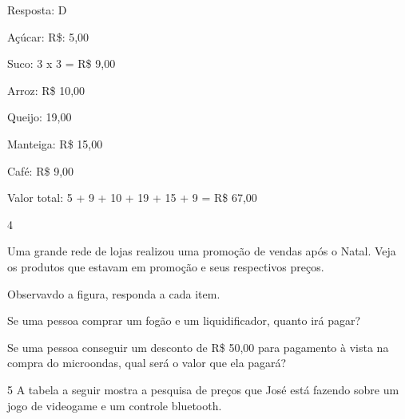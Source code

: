 {Resposta: D

Açúcar: R\$: 5,00

Suco: 3 x 3 = R\$ 9,00

Arroz: R\$ 10,00

Queijo: 19,00

Manteiga: R\$ 15,00

Café: R\$ 9,00

Valor total: 5 + 9 + 10 + 19 + 15 + 9 = R\$ 67,00

\num{4}

Uma grande rede de lojas realizou uma promoção de vendas após o Natal.
Veja os produtos que estavam em promoção e seus respectivos preços.






Observavdo a figura, responda a cada item.

\begin{escolha}

\item
  Se uma pessoa comprar um fogão e um liquidificador, quanto irá pagar?

\item
  Se uma pessoa conseguir um desconto de R\$ 50,00 para pagamento à
  vista na compra do microondas, qual será o valor que ela pagará?

\end{escolha}

\num{5} A tabela a seguir mostra a pesquisa de preços que José está fazendo
sobre um jogo de videogame e um controle bluetooth.

}
